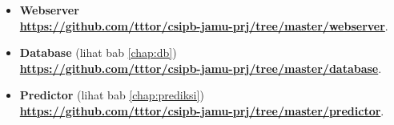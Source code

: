 \begin{itemize}
\item \textbf{Webserver}\\
\href{https://github.com/tttor/csipb-jamu-prj/tree/master/webserver}{\textbf{https://github.com/tttor/csipb-jamu-prj/tree/master/webserver}}.
\item \textbf{Database} (lihat bab \ref{chap:db})\\
\href{https://github.com/tttor/csipb-jamu-prj/tree/master/database}{\textbf{https://github.com/tttor/csipb-jamu-prj/tree/master/database}}.
\item \textbf{Predictor} (lihat bab \ref{chap:prediksi})\\
\href{https://github.com/tttor/csipb-jamu-prj/tree/master/predictor}{\textbf{https://github.com/tttor/csipb-jamu-prj/tree/master/predictor}}.
\end{itemize}
